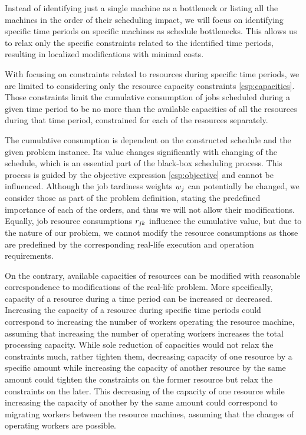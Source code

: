 Instead of identifying just a single machine as a bottleneck
or listing all the machines in the order of their scheduling impact,
we will focus on identifying specific time periods on specific machines as schedule bottlenecks.
This allows us to relax only the specific constraints related to the identified time periods,
resulting in localized modifications with minimal costs.

With focusing on constraints related to resources during specific time periods,
we are limited to considering only the resource capacity constraints \eqref{csp:capacities}.
Those constraints limit the cumulative consumption of jobs scheduled during a given time period
to be no more than the available capacities of all the resources during that time period,
constrained for each of the resources separately.

The cumulative consumption is dependent on the constructed schedule and the given problem instance.
Its value changes significantly with changing of the schedule,
which is an essential part of the black-box scheduling process.
This process is guided by the objective expression \eqref{csp:objective} and cannot be influenced.
Although the job tardiness weights $w_{j}$ can potentially be changed,
we consider those as part of the problem definition,
stating the predefined importance of each of the orders,
and thus we will not allow their modifications.
Equally, job resource consumptions $r_{j k}$ influence the cumulative value,
but due to the nature of our problem,
we cannot modify the resource consumptions as those are predefined by the corresponding real-life
execution and operation requirements.

On the contrary, available capacities of resources can be modified with reasonable correspondence
to modifications of the real-life problem.
More specifically, capacity of a resource during a time period can be increased or decreased.
Increasing the capacity of a resource during specific time periods could correspond to increasing
the number of workers operating the resource machine,
assuming that increasing the number of operating workers increases the total processing capacity.
While sole reduction of capacities would not relax the constraints much, rather tighten them,
decreasing capacity of one resource by a specific amount while increasing the capacity of another resource
by the same amount could tighten the constraints on the former resource but relax the constraints on the later.
This decreasing of the capacity of one resource while increasing the capacity of another by the same amount
could correspond to migrating workers between the resource machines,
assuming that the changes of operating workers are possible.

